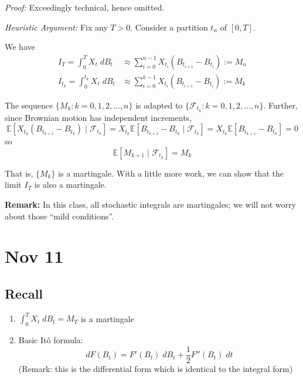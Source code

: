 \documentclass[12pt]{report}
\newcommand{\F}{\mathcal{F}}
\newcommand{\E}{\mathbb{E}}
\newcommand*{\tbf}[1]{\ifmmode\mathbf{#1}\else\textbf{#1}\fi}
\newenvironment*{tbox}[2][gray]{
    \begin{tcolorbox}[
        parbox=false,
        colback=#1!5!white,
        colframe=#1!75!black,
        breakable,
        title={#2}
    ]}
    {\end{tcolorbox}}
\begin{document}
    \begin{tbox}{\textbf{Theorem:} Let $X = \{X_t\}$ be an adapted process. THen the stochastic integral $\{I_t: t \geq 0\}$ defined by 
        \[I_t = \int_0^t X_s \; dB_s\] 
        is a martingale under mild conditions. In particular, its expected value is $0$.}
        \emph{Proof:} Exceedingly technical, hence omitted. 

        \emph{Heuristic Argument:} Fix any $T > 0$. Consider a partition $t_n$ of $[0, T]$. 

        We have 
        \begin{align*}
            I_T = \int_0^T X_t \; dB_t &\approx \sum_{i=0}^{n-1} X_{t_i} (B_{t_{i+1}} - B_{t_i}) := M_n\\ 
            I_{t_k} = \int_0^{t_k} X_t \; dB_t &\approx \sum_{i=0}^{k-1} X_{t_i} (B_{t_{i+1}} - B_{t_i}) := M_k
        \end{align*}

        The sequence $\{M_k: k = 0, 1, 2, \dots, n\}$ is adapted to $\{\F_{t_k}: k = 0, 1, 2, \dots, n\}$. Further, since Brownian motion has independent increments, 
        \[\E[X_{t_k}(B_{t_{k+1}} - B_{t_k}) \; | \; \F_{t_k}] = X_{t_k} \E[B_{t_{k+1}} - B_{t_k} \; | \; \F_{t_k}] = X_{t_k} \E[B_{t_{k+1}} - B_{t_k}] = 0\]
        so 
        \[\E[M_{k+1} \; | \; \F_{t_k}] = M_k\]

        That is, $\{M_k\}$ is a martingale. With a little more work, we can show that the limit $I_T$ is also a martingale.
    \end{tbox}

    \tbf{Remark:} In this class, all stochastic integrals are martingales; we will not worry about those ``mild conditions''. 

\section{Nov 11}
\subsection{Recall}
\begin{enumerate}
    \item $\int_0^T X_t \;dB_t = M_T$ is a martingale
    \item Basic Itô formula:
    \[dF(B_t) = F'(B_t) \; dB_t + \frac{1}{2} F''(B_t)\; dt\]
    (Remark: this is the differential form which is identical to the integral form)
\end{enumerate}
\end{document}

